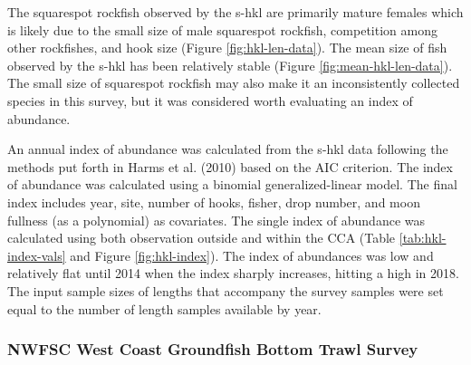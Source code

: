 \documentclass[11pt,
  english,
  a4paper,
]{article}
\begin{document}
\leavevmode\tagmcend\tagstructend\par


The squarespot rockfish observed by the \Gls{s-hkl} are primarily mature females which is likely due to the small size of male squarespot rockfish, competition among other rockfishes, and hook size (Figure \ref{fig:hkl-len-data}). The mean size of fish observed by the \Gls{s-hkl} has been relatively stable (Figure \ref{fig:mean-hkl-len-data}). The small size of squarespot rockfish may also make it an inconsistently collected species in this survey, but it was considered worth evaluating an index of abundance.

\leavevmode\tagmcend\tagstructend\par


An annual index of abundance was calculated from the \Gls{s-hkl} data following the methods put forth in Harms et al. {(2010)\leavevmode\tagmcend\tagstructend} based on the AIC criterion. The index of abundance was calculated using a binomial generalized-linear model. The final index includes year, site, number of hooks, fisher, drop number, and moon fullness (as a polynomial) as covariates. The single index of abundance was calculated using both observation outside and within the CCA (Table \ref{tab:hkl-index-vals} and Figure \ref{fig:hkl-index}). The index of abundances was low and relatively flat until 2014 when the index sharply increases, hitting a high in 2018. The input sample sizes of lengths that accompany the survey samples were set equal to the number of length samples available by year.

\leavevmode\tagmcend\tagstructend\par


\hypertarget{nwfsc-west-coast-groundfish-bottom-trawl-survey}{%
\subsubsection{NWFSC West Coast Groundfish Bottom Trawl Survey}\label{nwfsc-west-coast-groundfish-bottom-trawl-survey}}

\leavevmode\tagmcend\tagstructend

\end{document}

